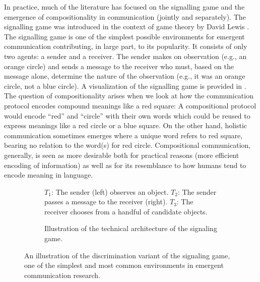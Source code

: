 In practice, much of the literature has focused on the signalling game and the emergence of compositionality in communication (jointly and separately).
The signalling game was introduced in the context of game theory by David Lewis \citep{lewis1970ConventionAP}.
The signalling game is one of the simplest possible environments for emergent communication contributing, in large part, to its popularity.
It consists of only two agents: a sender and a receiver.
The sender makes on observation (e.g., an orange circle) and sends a message to the receiver who must, based on the message alone, determine the nature of the observation (e.g., it was an orange circle, not a blue circle).
A visualization of the signalling game is provided in .
The question of compositionality arises when we look at how the communication protocol encodes compound meanings like a red square: A compositional protocol would encode ``red'' and ``circle'' with their own words which could be reused to express meanings like a red circle or a blue square.
On the other hand, holistic communication sometimes emerges where a unique word refers to red square, bearing no relation to the word(s) for red circle.
Compositional communication, generally, is seen as more desirable both for practical reasons (more efficient encoding of information) as well as for its resemblance to how humans tend to encode meaning in language.

\begin{figure}
  \centering
  \begin{subfigure}[b]{0.53\textwidth}
    \centering
    \setlength\fboxsep{0pt}
    
    \vspace{1cm}
    \caption{%
      $T_1$: The sender (left) observes an object.
      $T_2$: The sender passes a message to the receiver (right).
      $T_3$: The receiver chooses from a handful of candidate objects.
    }
    \unskip\label{fig:boxface}
  \end{subfigure}
  \hfill
  \begin{subfigure}[b]{0.45\textwidth}
    \centering
    
    \caption{Illustration of the technical architecture of the signaling game.}
    \unskip\label{fig:signaling-chart}
  \end{subfigure}
  \caption{%
    An illustration of the discrimination variant of the signaling game, one of the simplest and most common environments in emergent communication research.
  }
  \unskip\label{fig:signaling-game}
\end{figure}


